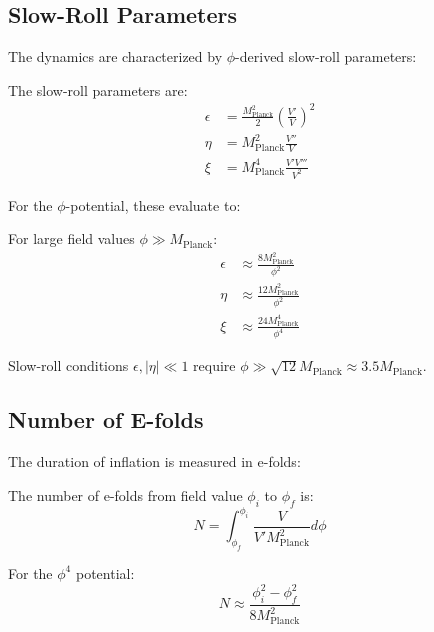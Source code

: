 \subsection{Slow-Roll Parameters}

The dynamics are characterized by $\phi$-derived slow-roll parameters:

\begin{definition}
The slow-roll parameters are:
\begin{align}
\epsilon &= \frac{M_{\text{Planck}}^2}{2} \left(\frac{V'}{V}\right)^2 \label{eq:epsilon_slow_roll} \\
\eta &= M_{\text{Planck}}^2 \frac{V''}{V} \label{eq:eta_slow_roll} \\
\xi &= M_{\text{Planck}}^4 \frac{V' V'''}{V^2} \label{eq:xi_slow_roll}
\end{align}
\end{definition}

For the $\phi$-potential, these evaluate to:

\begin{theorem}
For large field values $\phi \gg M_{\text{Planck}}$:
\begin{align}
\epsilon &\approx \frac{8M_{\text{Planck}}^2}{\phi^2} \\
\eta &\approx \frac{12M_{\text{Planck}}^2}{\phi^2} \\
\xi &\approx \frac{24M_{\text{Planck}}^4}{\phi^4}
\end{align}
\end{theorem}

Slow-roll conditions $\epsilon, |\eta| \ll 1$ require $\phi \gg \sqrt{12} M_{\text{Planck}} \approx 3.5 M_{\text{Planck}}$.

\subsection{Number of E-folds}

The duration of inflation is measured in e-folds:

\begin{theorem}
The number of e-folds from field value $\phi_i$ to $\phi_f$ is:
\begin{equation}
N = \int_{\phi_f}^{\phi_i} \frac{V}{V' M_{\text{Planck}}^2} d\phi
\label{eq:e_folds_integral}
\end{equation}
\end{theorem}

For the $\phi^4$ potential:
\begin{equation}
N \approx \frac{\phi_i^2 - \phi_f^2}{8M_{\text{Planck}}^2}
\label{eq:phi4_e_folds}
\end{equation}

